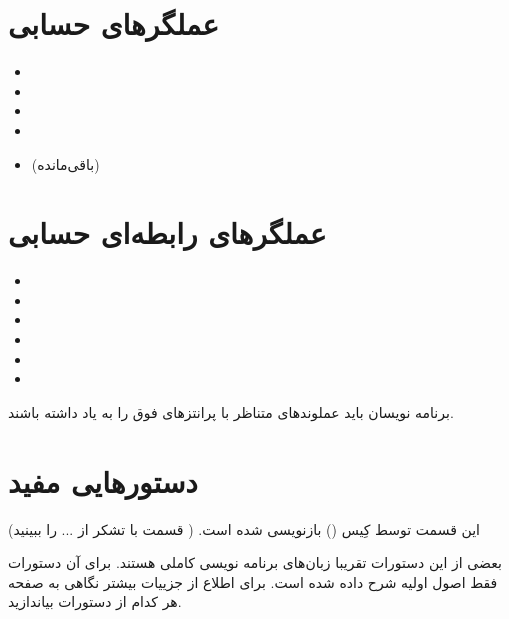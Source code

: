\section*{عملگرهای حسابی}

\begin{itemize}
\item{\code{+}}
\item{\code{-}}
\item{\code{*}}
\item{\code{/}}
\item{\code{\%} (باقی‌مانده)}
\end{itemize}

\section*{عملگرهای رابطه‌ای حسابی}
\begin{itemize}
\item{}
\item{}
\item{}
\item{}
\item{}
\item{}
\end{itemize}
برنامه نویسان  باید عملوند‌های متناظر با پرانتز‌های فوق را به یاد داشته باشند.

\section*{دستورهایی مفید}
این قسمت توسط کِیس () بازنویسی شده است. ( قسمت با تشکر از ... را ببینید)

بعضی از این دستورات تقریبا زبان‌های برنامه نویسی کاملی هستند. برای آن دستورات فقط
اصول اولیه شرح داده شده است. برای اطلاع از جزییات بیشتر نگاهی به صفحه  هر کدام
از دستورات بیاندازید.

